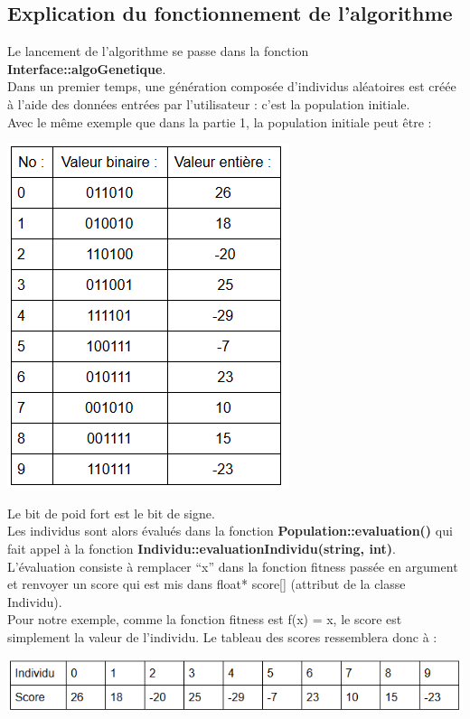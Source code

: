 \documentclass[a4paper,11pt]{article}
\begin{document}
		\subsection{Explication du fonctionnement de l’algorithme}
			Le lancement de l’algorithme se passe dans la fonction \textbf{Interface::algoGenetique}.\\
			Dans un premier temps, une génération composée d’individus aléatoires est créée à l’aide des données entrées par l’utilisateur : c’est la population initiale.\\
			Avec le même exemple que dans la partie 1, la population initiale peut être :\\
			\centerline{\includegraphics[scale=0.5]{ExemplePopulationInitiale.png}}
			Le bit de poid fort est le bit de signe.\\
			
			Les individus sont alors évalués dans la fonction \textbf{Population::evaluation()} qui fait appel à la fonction \textbf{Individu::evaluationIndividu(string, int)}.\\
			L’évaluation consiste à remplacer “x” dans la fonction fitness passée en argument et renvoyer un score qui est mis dans float* score[] (attribut de la classe Individu).\\
			Pour notre exemple, comme la fonction fitness est f(x) = x, le score est simplement la valeur de l’individu. Le tableau des scores ressemblera donc à : \\
			\centerline{\includegraphics[scale=0.5]{Evaluation.png}}\\
			
\end{document}
